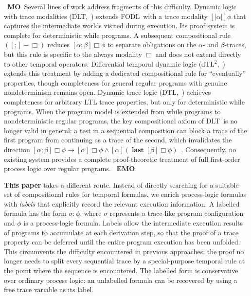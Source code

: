 \documentclass[manuscript,screen]{acmart}
\DeclareMathOperator{\seq}{;}
\DeclareMathOperator{\last}{\mathbf{last}}
\newcommand{\FODL}[0]{\mbox{FODL}}
\newcommand{\DLT}[0]{\mbox{DLT}}
\newcommand{\A}[1]{\mbox{ \textbf{#1} }}
\newcommand{\MO}{\A{MO}}
\newcommand{\EMO}{\A{EMO}}
\begin{document}
\ifx
\MO Several lines of work address fragments of this difficulty.  Dynamic logic with trace modalities (\DLT,~\cite{Beckert01}) extends \FODL\ with a trace modality $[|\alpha|]\phi$ that captures the intermediate worlds visited during execution. Its proof system is complete for deterministic while programs.  A subsequent compositional rule $([\seq]-\Box)$ reduces $[\alpha\seq\beta]\Box\phi$ to separate obligations on the $\alpha$- and $\beta$-traces, but this rule is specific to the always modality $\Box$ and does not extend directly to other temporal operators.  Differential temporal dynamic logic (dTL$^2$,~\cite{DTL2}) extends this treatment by adding a dedicated compositional rule for ``eventually'' properties, though completeness for general regular programs with genuine nondeterminism remains open.  Dynamic trace logic (DTL,~\cite{Beckert13}) achieves completeness for arbitrary LTL trace properties, but only for deterministic while programs.  When the program model is extended from while programs to nondeterministic regular programs, the key compositional axiom of \DLT\ is no longer valid in general: a test in a sequential composition can block a trace of the first program from continuing as a trace of the second, which invalidates the direction $[\alpha\seq\beta]\Box\phi\rightarrow [\alpha]\Box\phi\wedge [\alpha](\last [\beta]\Box\phi)$~\cite{Zhang24}.  Consequently, no existing system provides a complete proof-theoretic treatment of full first-order process logic over regular programs. \EMO
\fi

\textbf{This paper} takes a different route. Instead of directly searching for a suitable set of compositional rules for temporal formulas, we enrich process-logic formulas with \emph{labels} that explicitly record the relevant execution information.  A labelled formula has the form $\sigma:\phi$, where $\sigma$ represents a trace-like program configuration and $\phi$ is a process-logic formula. 
Labels allow the intermediate execution results of programs to accumulate at each derivation step, so that the proof of a trace property can be deferred until the entire program execution has been unfolded.  This circumvents the difficulty encountered in previous approaches: the proof no longer needs to split every sequential trace by a special-purpose temporal rule at the point where the sequence is encountered. 
The labelled form is conservative over ordinary process logic: an unlabelled formula can be recovered by using a free trace variable as its label.
\end{document}
